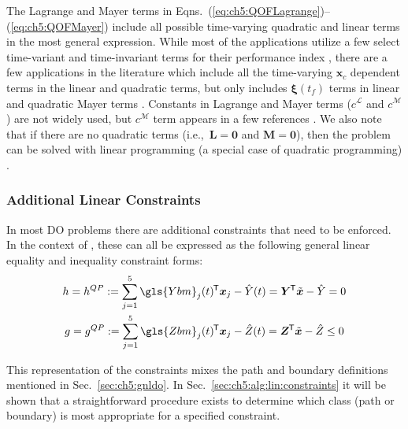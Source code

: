 The Lagrange and Mayer terms in Eqns.~(\ref{eq:ch5:QOFLagrange})--(\ref{eq:ch5:QOFMayer}) include all possible time-varying quadratic and linear terms in the most general expression.
While most of the applications utilize a few select time-variant and time-invariant terms for their performance index \cite{Hampton1996a, Popescu2009a, Campbell2013a, Gerdts2015a, Tang2007a, Jerez2011a, Bashein1971a}, there are a few applications in the literature which include all the time-varying $\bm{x}_c$ dependent terms in the linear and quadratic terms, but only includes $\bm{\xi}(t_f)$ terms in linear and quadratic Mayer terms \cite{Wang1992a, Sideris2010a, Han2012a}.
Constants in Lagrange and Mayer terms ($c^{\mathcal{L}}$ and $c^{\mathcal{M}}$) are not widely used, but $c^{\mathcal{M}}$ term appears in a few references \cite{Gerdts2015a}.
We also note that if there are no quadratic terms (i.e.,~$\bm{L}=\bm{0}$ and $\bm{M}=\bm{0}$), then the \lqdo{} problem can be solved with linear programming (a special case of quadratic programming) \cite{Boyd2009a}.

\subsubsection{Additional Linear Constraints} 

In most DO problems there are additional constraints that need to be enforced.
In the context of \lqdo, these can all be expressed as the following general linear equality and inequality constraint forms:%
\allowdisplaybreaks[1]%
\begin{gather}
h = h^{QP} := \sum_{j=1}^5 \gls{Ybm}_{j}(t)\tran \bm{x}_j - \hat{Y}(t) = \bm{Y}\tran \tilde{\bm{x}} - \hat{Y} = 0 \label{eq:ch5:hqp} \\
g = g^{QP} := \sum_{j=1}^5 \gls{Zbm}_{j}(t)\tran \bm{x}_j - \hat{Z}(t) = \bm{Z}\tran \tilde{\bm{x}} - \hat{Z} \leq 0 \label{eq:ch5:gqp}
\end{gather}%
\allowdisplaybreaks[0]%

\noindent This representation of the constraints mixes the path and boundary definitions mentioned in Sec.~\ref{sec:ch5:gnldo}. In Sec.~\ref{sec:ch5:alg:lin:constraints} it will be shown that a straightforward procedure exists to determine which class (path or boundary) is most appropriate for a specified constraint. 


